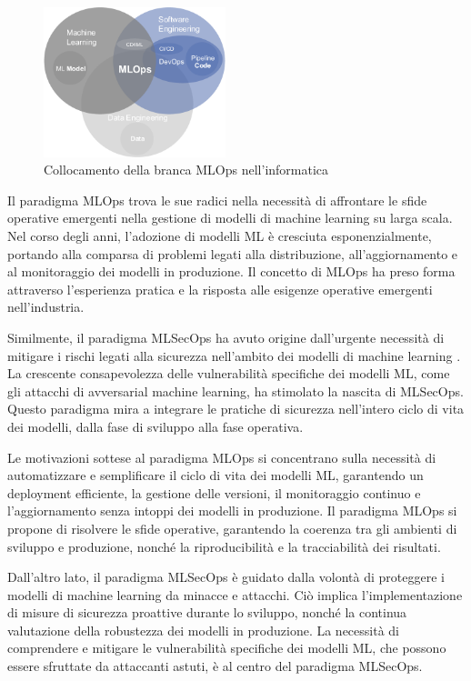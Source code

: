 \begin{figure}[h]
    \centering
    \includegraphics[width=200px]{figures/ch1/mlops-flow.png}
    \caption[Intersezione fra Machine Learning, DevOps e Data Engineering]{Collocamento della branca MLOps nell'informatica}
    \label{fig:cha1:mlops}
\end{figure}

Il paradigma MLOps \cite{mlops} trova le sue radici nella necessità di affrontare le sfide operative emergenti nella gestione di modelli di machine learning su larga scala. Nel corso degli anni, l'adozione di modelli ML è cresciuta esponenzialmente, portando alla comparsa di problemi legati alla distribuzione, all'aggiornamento e al monitoraggio dei modelli in produzione. Il concetto di MLOps ha preso forma attraverso l'esperienza pratica e la risposta alle esigenze operative emergenti nell'industria.

Similmente, il paradigma MLSecOps ha avuto origine dall'urgente necessità di mitigare i rischi legati alla sicurezza nell'ambito dei modelli di machine learning \cite{adv_ml_1}. La crescente consapevolezza delle vulnerabilità specifiche dei modelli ML, come gli attacchi di avversarial machine learning, ha stimolato la nascita di MLSecOps. Questo paradigma mira a integrare le pratiche di sicurezza nell'intero ciclo di vita dei modelli, dalla fase di sviluppo alla fase operativa.

Le motivazioni sottese al paradigma MLOps si concentrano sulla necessità di automatizzare e semplificare il ciclo di vita dei modelli ML, garantendo un deployment efficiente, la gestione delle versioni, il monitoraggio continuo e l'aggiornamento senza intoppi dei modelli in produzione. Il paradigma MLOps si propone di risolvere le sfide operative, garantendo la coerenza tra gli ambienti di sviluppo e produzione, nonché la riproducibilità e la tracciabilità dei risultati.

Dall'altro lato, il paradigma MLSecOps è guidato dalla volontà di proteggere i modelli di machine learning da minacce e attacchi. Ciò implica l'implementazione di misure di sicurezza proattive durante lo sviluppo, nonché la continua valutazione della robustezza dei modelli in produzione. La necessità di comprendere e mitigare le vulnerabilità specifiche dei modelli ML, che possono essere sfruttate da attaccanti astuti, è al centro del paradigma MLSecOps.

